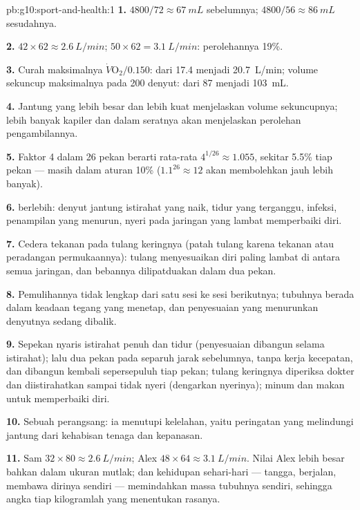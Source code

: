 \begin{solution}{pb:g10:sport-and-health:1}
\textbf{1.} $4800/72 \approx \qty{67}{mL}$ sebelumnya; $4800/56 \approx
\qty{86}{mL}$ sesudahnya.

\textbf{2.} $42 \times 62 \approx \qty{2.6}{L/min}$; $50 \times 62 =
\qty{3.1}{L/min}$: perolehannya 19\%.

\textbf{3.} Curah maksimalnya $\dot V\!\mathrm{O_2}/0.150$: dari
\num{17.4} menjadi \qty{20.7}{L/min}; volume sekuncup maksimalnya pada
200 denyut: dari \num{87} menjadi \qty{103}{mL}.

\textbf{4.} Jantung yang lebih besar dan lebih kuat menjelaskan volume
sekuncupnya; lebih banyak kapiler dan  dalam seratnya akan
menjelaskan perolehan pengambilannya.

\textbf{5.} Faktor 4 dalam 26 pekan berarti rata-rata $4^{1/26}
\approx 1.055$, sekitar 5.5\% tiap pekan --- masih dalam aturan 10\% ($1.1^{26}
\approx 12$ akan membolehkan jauh lebih banyak).

\textbf{6.}  berlebih: denyut jantung istirahat yang naik, tidur
yang terganggu, infeksi, penampilan yang menurun, nyeri pada jaringan
yang lambat memperbaiki diri.

\textbf{7.} Cedera tekanan pada tulang keringnya (patah tulang karena
tekanan atau peradangan permukaannya): tulang menyesuaikan diri paling
lambat di antara semua jaringan, dan bebannya dilipatduakan dalam dua pekan.

\textbf{8.} Pemulihannya tidak lengkap dari satu sesi ke sesi
berikutnya; tubuhnya berada dalam keadaan tegang yang menetap, dan
penyesuaian yang menurunkan denyutnya sedang dibalik.

\textbf{9.} Sepekan nyaris istirahat penuh dan tidur (penyesuaian
dibangun selama istirahat); lalu dua pekan pada separuh jarak
sebelumnya, tanpa kerja kecepatan, dan dibangun kembali sepersepuluh
tiap pekan; tulang keringnya diperiksa dokter dan diistirahatkan sampai
tidak nyeri (dengarkan nyerinya); minum dan makan untuk memperbaiki diri.

\textbf{10.} Sebuah perangsang: ia menutupi kelelahan, yaitu peringatan
yang melindungi jantung dari kehabisan tenaga dan kepanasan.

\textbf{11.} Sam $32 \times 80 \approx \qty{2.6}{L/min}$; Alex $48
\times 64 \approx \qty{3.1}{L/min}$. Nilai Alex lebih besar bahkan
dalam ukuran mutlak; dan kehidupan sehari-hari --- tangga, berjalan,
membawa dirinya sendiri --- memindahkan massa tubuhnya sendiri,
sehingga angka tiap kilogramlah yang menentukan rasanya.


\end{solution}
